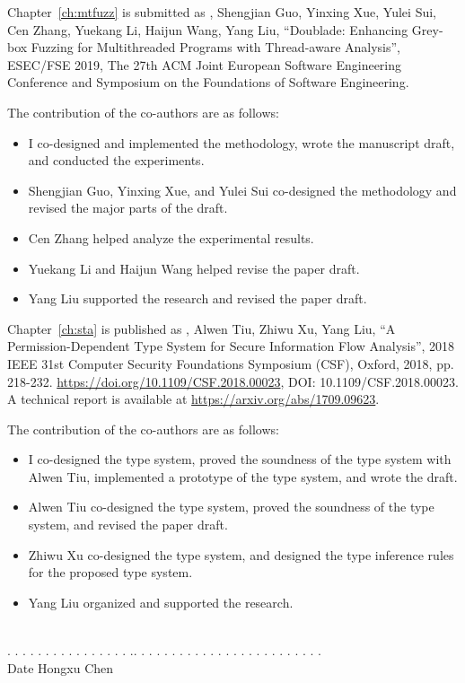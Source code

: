 \noindent Chapter~\ref{ch:mtfuzz} is submitted as \myname, Shengjian Guo, Yinxing Xue, Yulei Sui, Cen Zhang, Yuekang Li, Haijun Wang, Yang Liu, ``Doublade: Enhancing Grey-box Fuzzing for Multithreaded Programs with Thread-aware Analysis'', ESEC/FSE 2019, The 27th ACM Joint European Software Engineering Conference and Symposium on the Foundations of Software Engineering.

\noindent The contribution of the co-authors are as follows:
\begin{itemize}
	\item I co-designed and implemented the methodology, wrote the manuscript draft, and conducted the experiments.
	\item Shengjian Guo, Yinxing Xue, and Yulei Sui co-designed the methodology and revised the major parts of the draft.
	\item Cen Zhang helped analyze the experimental results.
	\item Yuekang Li and Haijun Wang helped revise the paper draft.
	\item Yang Liu supported the research and revised the paper draft.
\end{itemize}

\noindent Chapter~\ref{ch:sta} is published as \myname, Alwen Tiu, Zhiwu Xu, Yang Liu, ``A Permission-Dependent Type System for Secure Information Flow Analysis'', 2018 IEEE 31st Computer Security Foundations Symposium (CSF), Oxford, 2018, pp. 218-232. \url{https://doi.org/10.1109/CSF.2018.00023}, DOI: 10.1109/CSF.2018.00023. A technical report is available at \url{https://arxiv.org/abs/1709.09623}.

\noindent The contribution of the co-authors are as follows:
\begin{itemize}
	\item I co-designed the type system, proved the soundness of the type system with Alwen Tiu, implemented a prototype of the type system, and wrote the draft.
	\item Alwen Tiu co-designed the type system, proved the soundness of the type system, and revised the paper draft.
	\item Zhiwu Xu co-designed the type system, and designed the type inference rules for the proposed type system.
	\item Yang Liu organized and supported the research.
\end{itemize}

\vspace{150pt}

 \ \   \qquad \qquad \qquad \qquad\qquad\qquad\qquad\qquad\quad \\
. . . . . . . . . . . . . . . . .\qquad \qquad \qquad \qquad\qquad \qquad . . . .  . . . . . . . . . . . . . . . . . . . . .\\
\indent \qquad Date \qquad \qquad \qquad  \qquad \qquad \qquad\qquad\qquad\qquad\qquad Hongxu Chen
